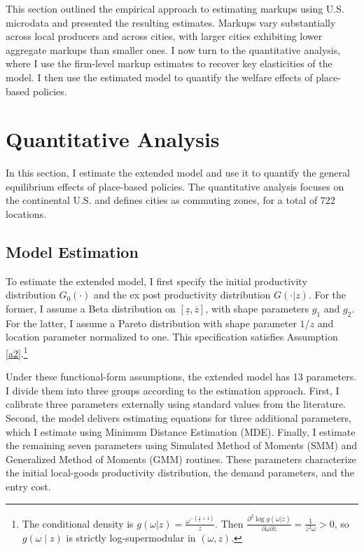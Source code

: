 This section outlined the empirical approach to estimating markups using U.S. microdata and presented the resulting estimates. Markups vary substantially across local producers and across cities, with larger cities exhibiting lower aggregate markups than smaller ones. I now turn to the quantitative analysis, where I use the firm-level markup estimates to recover key elasticities of the model. I then use the estimated model to quantify the welfare effects of place-based policies.

\section{Quantitative Analysis}\label{s:quant}
In this section, I estimate the extended model and use it to quantify the general equilibrium effects of place-based policies. The quantitative analysis focuses on the continental U.S. and defines cities as commuting zones, for a total of 722 locations.

\subsection{Model Estimation}
To estimate the extended model, I first specify the initial productivity distribution $G_0(\cdot)$ and the ex post productivity distribution $G(\cdot | z)$. For the former, I assume a Beta distribution on $[\underline{z},\overline{z}]$, with shape parameters $g_1$ and $g_2$. For the latter, I assume a Pareto distribution with shape parameter $1/z$ and location parameter normalized to one. This specification satisfies Assumption \ref{a2}.\footnote{The conditional density is $g(\omega | z)=\frac{\omega^{-\left(\frac{1}{z}+1\right)}}{z}$. Then $\frac{\partial^2 \log g(\omega | z)}{\partial \omega \partial z}=\frac{1}{z^2 \omega}>0$, so $g(\omega\mid z)$ is strictly log-supermodular in $(\omega,z)$.}

Under these functional-form assumptions, the extended model has 13 parameters. I divide them into three groups according to the estimation approach. First, I calibrate three parameters externally using standard values from the literature. Second, the model delivers estimating equations for three additional parameters, which I estimate using Minimum Distance Estimation (MDE). Finally, I estimate the remaining seven parameters using Simulated Method of Moments (SMM) and Generalized Method of Moments (GMM) routines. These parameters characterize the initial local-goods productivity distribution, the demand parameters, and the entry cost.

